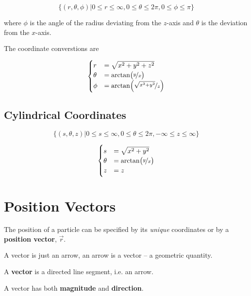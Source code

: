 \begin{equation}
	\{(r, \theta, \phi) \vert 0 \leq r \leq \infty, 0 \leq \theta \leq 2 \pi, 0 \leq \phi \leq \pi\}
\end{equation}

where $\phi$ is the angle of the radius deviating from the $z$-axis and $\theta$ is the deviation from the $x$-axis.

The coordinate converstions are

\begin{equation}
	\begin{cases}
		r &= \sqrt{x^2 + y^2 + z^2}\\
		\theta &= \arctan(\nicefrac{y}{x})\\
		\phi &= \arctan(\nicefrac{\sqrt{x^2 + y^2}}{z})
	\end{cases}
\end{equation}

\subsection{Cylindrical Coordinates}

\begin{equation}
	\{(s,\theta,z) \vert 0 \leq s \leq \infty, 0 \leq \theta \leq 2\pi, -\infty \leq z \leq \infty\}
\end{equation}

\begin{equation}
	\begin{cases}
		s &= \sqrt{x^2 + y^2}\\
		\theta &= \arctan(\nicefrac{y}{x})\\
		z &= z
	\end{cases}
\end{equation}

\section{Position Vectors}

The position of a particle can be specified by its \textit{unique} coordinates or by a \textbf{position vector}, $\vec{r}$.

A vector is just an arrow, an arrow is a vector -- a geometric quantity.

\begin{definition}[Vector]
	A \textbf{vector} is a directed line segment, i.e. an arrow.
\end{definition}

A vector has both \textbf{magnitude} and \textbf{direction}.

